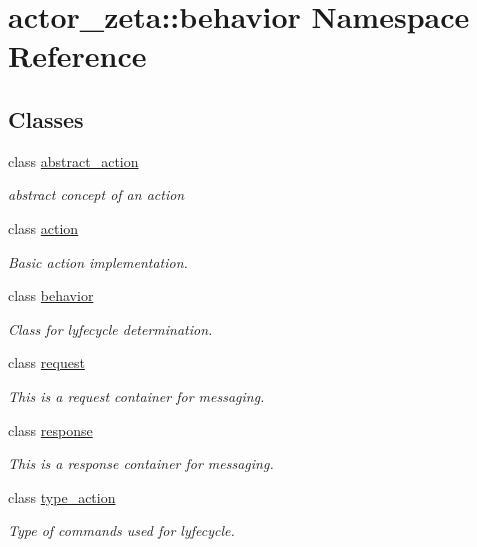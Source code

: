 \hypertarget{namespaceactor__zeta_1_1behavior}{}\section{actor\+\_\+zeta\+:\+:behavior Namespace Reference}
\label{namespaceactor__zeta_1_1behavior}
\subsection*{Classes}
\begin{DoxyCompactItemize}
\item 
class \hyperlink{classactor__zeta_1_1behavior_1_1abstract__action}{abstract\+\_\+action}
\begin{DoxyCompactList}\small\item\em abstract concept of an action \end{DoxyCompactList}\item 
class \hyperlink{classactor__zeta_1_1behavior_1_1action}{action}
\begin{DoxyCompactList}\small\item\em Basic action implementation. \end{DoxyCompactList}\item 
class \hyperlink{classactor__zeta_1_1behavior_1_1behavior}{behavior}
\begin{DoxyCompactList}\small\item\em Class for lyfecycle determination. \end{DoxyCompactList}\item 
class \hyperlink{classactor__zeta_1_1behavior_1_1request}{request}
\begin{DoxyCompactList}\small\item\em This is a request container for messaging. \end{DoxyCompactList}\item 
class \hyperlink{classactor__zeta_1_1behavior_1_1response}{response}
\begin{DoxyCompactList}\small\item\em This is a response container for messaging. \end{DoxyCompactList}\item 
class \hyperlink{classactor__zeta_1_1behavior_1_1type__action}{type\+\_\+action}
\begin{DoxyCompactList}\small\item\em Type of commands used for lyfecycle. \end{DoxyCompactList}\end{DoxyCompactItemize}
